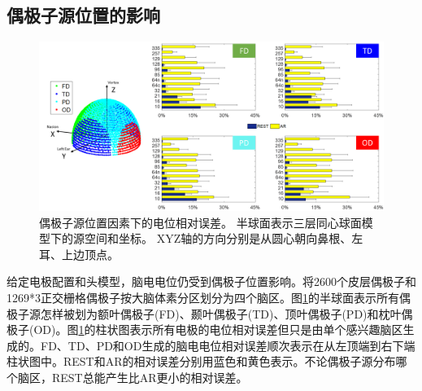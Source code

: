 \subsection{偶极子源位置的影响}
\begin{figure}[h!]
	\centering
	\includegraphics[width=15cm]{pic/JNE/figure6.png}
	\caption{偶极子源位置因素下的电位相对误差。 半球面表示三层同心球面模型下的源空间和坐标。 XYZ轴的方向分别是从圆心朝向鼻根、左耳、上边顶点。}
	\label{2:dip}
\end{figure}
给定电极配置和头模型，脑电电位仍受到偶极子位置影响。将2600个皮层偶极子和1269*3正交栅格偶极子按大脑体素分区划分为四个脑区。图\ref{2:dip}的半球面表示所有偶极子源怎样被划为额叶偶极子(FD)、颞叶偶极子(TD)、顶叶偶极子(PD)和枕叶偶极子(OD)。图\ref{2:dip}的柱状图表示所有电极的电位相对误差但只是由单个感兴趣脑区生成的。FD、TD、PD和OD生成的脑电电位相对误差顺次表示在从左顶端到右下端柱状图中。REST和AR的相对误差分别用蓝色和黄色表示。不论偶极子源分布哪个脑区，REST总能产生比AR更小的相对误差。

